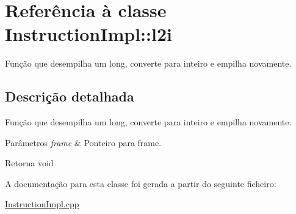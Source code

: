 \hypertarget{class_instruction_impl_1_1l2i}{}\section{Referência à classe Instruction\+Impl\+:\+:l2i}
\label{class_instruction_impl_1_1l2i}


Função que desempilha um long, converte para inteiro e empilha novamente.  




\subsection{Descrição detalhada}
Função que desempilha um long, converte para inteiro e empilha novamente. 


\begin{DoxyParams}{Parâmetros}
{\em frame} & Ponteiro para frame. \\
\hline
\end{DoxyParams}
\begin{DoxyReturn}{Retorna}
void 
\end{DoxyReturn}


A documentação para esta classe foi gerada a partir do seguinte ficheiro\+:\begin{DoxyCompactItemize}
\item 
\hyperlink{_instruction_impl_8cpp}{Instruction\+Impl.\+cpp}\end{DoxyCompactItemize}
